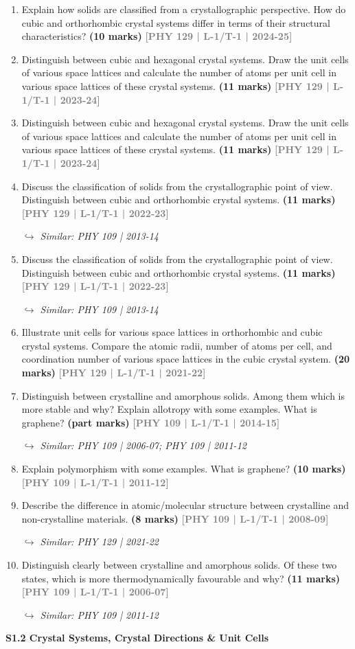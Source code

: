\documentclass[12pt,a3paper]{article}
\newcommand{\yr}[1]{\hfill\textcolor{gray}{\small\textbf{[#1]}}}
\newcommand{\mk}[1]{\textcolor{orange!70!black}{\small\textbf{(#1 marks)}}}
\newcommand{\variant}[1]{\par\vspace{1pt}\textcolor{blue!50!black}%
  {\footnotesize\textit{$\hookrightarrow$ Similar: #1}}}
\newcommand{\subtopic}[2]{%
  \vspace{10pt}
  \noindent\begin{tcolorbox}[colback=#1!8,colframe=#1,boxrule=0.6pt,arc=4pt,
    left=6pt,right=6pt,top=4pt,bottom=4pt]
    \small\bfseries\textcolor{#1}{#2}
  \end{tcolorbox}
  \vspace{2pt}
}
\begin{document}
\begin{enumerate}

\item Explain how solids are classified from a crystallographic perspective. How do
cubic and orthorhombic crystal systems differ in terms of their structural
characteristics?
\mk{10} \yr{PHY 129 | L-1/T-1 | 2024-25}

\item Distinguish between cubic and hexagonal crystal systems. Draw the unit cells of various space lattices and calculate the number of atoms per unit cell in various space lattices of these crystal systems.
\mk{11} \yr{PHY 129 | L-1/T-1 | 2023-24}

\item Distinguish between cubic and hexagonal crystal systems. Draw the unit cells of various space lattices and calculate the number of atoms per unit cell in various space lattices of these crystal systems.
\mk{11} \yr{PHY 129 | L-1/T-1 | 2023-24}

\item Discuss the classification of solids from the crystallographic point of view. Distinguish between cubic and orthorhombic crystal systems.
\mk{11} \yr{PHY 129 | L-1/T-1 | 2022-23}
\variant{PHY 109 | 2013-14}

\item Discuss the classification of solids from the crystallographic point of view. Distinguish between cubic and orthorhombic crystal systems.
\mk{11} \yr{PHY 129 | L-1/T-1 | 2022-23}
\variant{PHY 109 | 2013-14}

\item Illustrate unit cells for various space lattices in orthorhombic and cubic crystal systems. Compare the atomic radii, number of atoms per cell, and coordination number of various space lattices in the cubic crystal system.
\mk{20} \yr{PHY 129 | L-1/T-1 | 2021-22}


\item Distinguish between crystalline and amorphous solids. Among them which is more stable and why? Explain allotropy with some examples. What is graphene?
\mk{part} \yr{PHY 109 | L-1/T-1 | 2014-15}
\variant{PHY 109 | 2006-07; PHY 109 | 2011-12}

\item Explain polymorphism with some examples. What is graphene?
\mk{10} \yr{PHY 109 | L-1/T-1 | 2011-12}

\item Describe the difference in atomic/molecular structure between crystalline and non-crystalline materials.
\mk{8} \yr{PHY 109 | L-1/T-1 | 2008-09}
\variant{PHY 129 | 2021-22}

\item Distinguish clearly between crystalline and amorphous solids. Of these two states, which is more thermodynamically favourable and why?
\mk{11} \yr{PHY 109 | L-1/T-1 | 2006-07}
\variant{PHY 109 | 2011-12}

\end{enumerate}
\label{sec:s12}
\subtopic{cA}{S1.2 \quad Crystal Systems, Crystal Directions \& Unit Cells}
\end{document}

